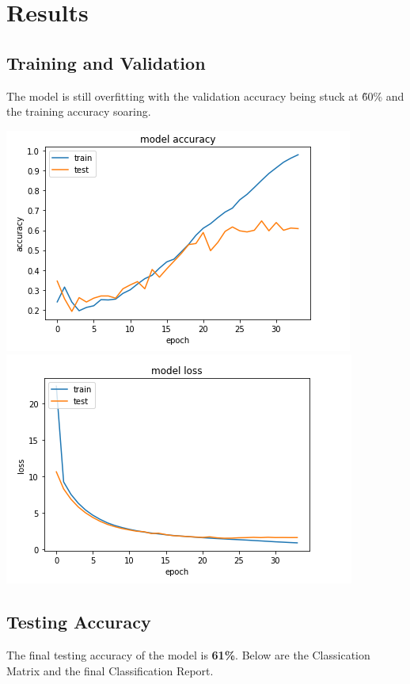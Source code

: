 \documentclass{article}
\begin{document}
    \section{Results}

    \subsection{Training and Validation}

    The model is still overfitting with the validation accuracy being stuck at \~60\% and the training accuracy soaring.

    \begin{center}
        \includegraphics[scale=0.5]{acc}
        \includegraphics[scale=0.5]{loss}
    \end{center}

    \subsection{Testing Accuracy}

    The final testing accuracy of the model is \textbf{61\%}. Below are the Classication Matrix and the final
    Classification Report.
\end{document}
